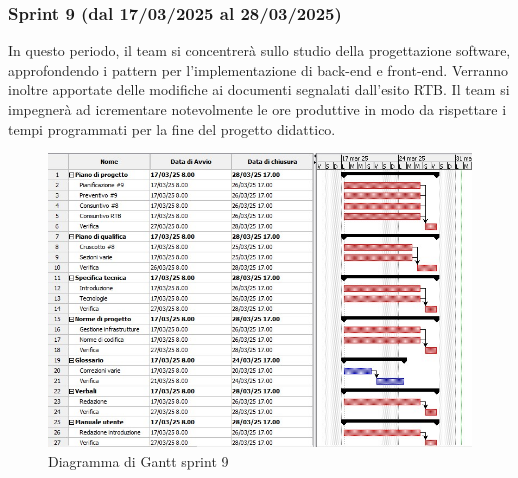 \subsubsection{Sprint 9 (dal 17/03/2025 al 28/03/2025)}
In questo periodo, il team si concentrerà sullo studio della progettazione software, approfondendo i pattern per l’implementazione di back-end e front-end.
Verranno inoltre apportate delle modifiche ai documenti segnalati dall'esito RTB.
Il team si impegnerà ad icrementare notevolmente le ore produttive in modo da rispettare i tempi programmati per la fine del progetto didattico.

\pagebreak
\begin{figure}[h!]
    \centering
    \includegraphics[scale = 0.7]{template/images/gantt9.png}
    \caption{Diagramma di Gantt sprint 9}
    \label{fig:3.9} %
\end{figure}

